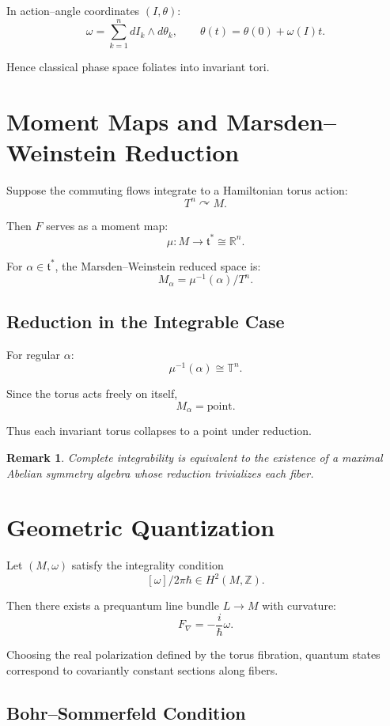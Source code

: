 \documentclass[11pt]{article}
\newtheorem{remark}{Remark}
\begin{document}
In action--angle coordinates $(I,\theta)$:
\[
\omega = \sum_{k=1}^n dI_k \wedge d\theta_k,
\qquad
\theta(t) = \theta(0) + \omega(I)t.
\]

Hence classical phase space foliates into invariant tori.

\section{Moment Maps and Marsden--Weinstein Reduction}

Suppose the commuting flows integrate to a Hamiltonian torus action:
\[
T^n \curvearrowright M.
\]

Then $F$ serves as a moment map:
\[
\mu : M \to \mathfrak{t}^* \cong \mathbb{R}^n.
\]

For $\alpha \in \mathfrak{t}^*$, the Marsden--Weinstein reduced space is:
\[
M_\alpha = \mu^{-1}(\alpha)/T^n.
\]

\subsection{Reduction in the Integrable Case}

For regular $\alpha$:
\[
\mu^{-1}(\alpha) \cong \mathbb{T}^n.
\]

Since the torus acts freely on itself,
\[
M_\alpha = \text{point}.
\]

Thus each invariant torus collapses to a point under reduction.

\begin{remark}
Complete integrability is equivalent to the existence of a maximal Abelian symmetry algebra whose reduction trivializes each fiber.
\end{remark}

\section{Geometric Quantization}

Let $(M,\omega)$ satisfy the integrality condition
\[
[\omega]/2\pi\hbar \in H^2(M,\mathbb{Z}).
\]

Then there exists a prequantum line bundle $L \to M$ with curvature:
\[
F_\nabla = -\frac{i}{\hbar}\omega.
\]

Choosing the real polarization defined by the torus fibration, quantum states correspond to covariantly constant sections along fibers.

\subsection{Bohr--Sommerfeld Condition}
\end{document}
